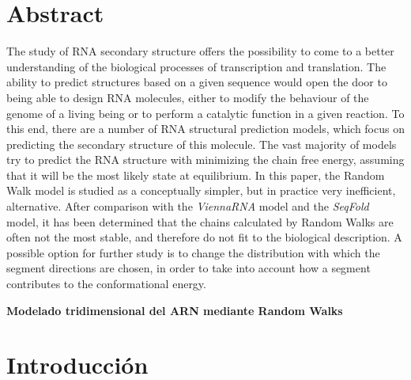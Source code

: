 \documentclass[a4paper,11pt,titlepage]{article}
\theoremstyle{definition}
\begin{document}
\section*{Abstract}\label{sec:abstract}

The study of RNA secondary structure offers the possibility to come to a better understanding of the biological processes of transcription and translation. The ability to predict structures based on a given sequence would open the door to being able to design RNA molecules, either to modify the behaviour of the genome of a living being or to perform a catalytic function in a given reaction. To this end, there are a number of RNA structural prediction models, which focus on predicting the secondary structure of this molecule. The vast majority of models try to predict the RNA structure with minimizing the chain free energy, assuming that it will be the most likely state at equilibrium. In this paper, the Random Walk model is studied as a conceptually simpler, but in practice very inefficient, alternative. After comparison with the \textit{ViennaRNA} model and the \textit{SeqFold} model, it has been determined that the chains calculated by Random Walks are often not the most stable, and therefore do not fit to the biological description. A possible option for further study is to change the distribution with which the segment directions are chosen, in order to take into account how a segment contributes to the conformational energy.

\newpage



\newpage

\setcounter{page}{1}
\tableofcontents

\newpage

\begin{center}
\Large\centering\textbf{Modelado tridimensional del ARN mediante Random Walks}
\end{center}




\section{Introducción}\label{sec:thry}
\end{document}
